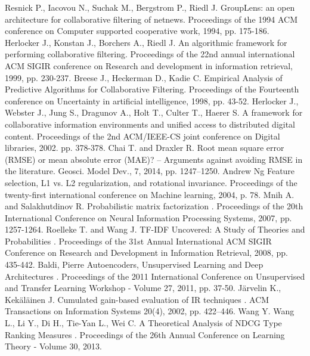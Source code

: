 \documentclass[a4paper,article,14pt]{extarticle}
\begin{document}
\begin{thebibliography}{1}
 Resnick P., Iacovou N., Suchak M., Bergstrom P., Riedl J. \flqq GroupLens: an open architecture for collaborative filtering of netnews\frqq. Proceedings of the 1994 ACM conference on Computer supported cooperative work, 1994, pp. 175-186.
 Herlocker J., Konstan J., Borchers A., Riedl J. \flqq An algorithmic framework for performing collaborative filtering\frqq. Proceedings of the 22nd annual international ACM SIGIR conference on Research and development in information retrieval, 1999, pp. 230-237.
 Breese J., Heckerman D., Kadie C. \flqq Empirical Analysis of Predictive Algorithms for Collaborative Filtering\frqq.  Proceedings of the Fourteenth conference on Uncertainty in artificial intelligence, 1998, pp. 43-52.
 Herlocker J., Webster J., Jung S., Dragunov A., Holt T., Culter T., Haerer S. \flqq A framework for collaborative information environments and unified access to distributed digital content\frqq. Proceedings of the 2nd ACM/IEEE-CS joint conference on Digital libraries, 2002. pp. 378-378.
 Chai T. and Draxler R. \flqq Root mean square error (RMSE) or mean absolute error (MAE)? – Arguments against avoiding RMSE in the literature\frqq. Geosci. Model Dev., 7, 2014, pp. 1247–1250.
 Andrew Ng \flqq Feature selection, L1 vs. L2 regularization, and rotational invariance\frqq. Proceedings of the twenty-first international conference on Machine learning, 2004, p. 78.
 Mnih A. and Salakhutdinov R. \flqq Probabilistic matrix factorization \frqq. Proceedings of the 20th International Conference on Neural Information Processing Systems, 2007, pp. 1257-1264.
 Roelleke T. and Wang J. \flqq TF-IDF Uncovered: A Study of Theories and Probabilities \frqq. Proceedings of the 31st Annual International ACM SIGIR Conference on Research and Development in Information Retrieval, 2008, pp. 435-442.
 Baldi, Pierre \flqq Autoencoders, Unsupervised Learning and Deep Architectures \frqq. Proceedings of the 2011 International Conference on Unsupervised and Transfer Learning Workshop - Volume 27, 2011, pp. 37-50.
 Järvelin K., Kekäläinen J. \flqq Cumulated gain-based evaluation of IR techniques \frqq. ACM Transactions on Information Systems 20(4), 2002, pp. 422–446.
 Wang Y. Wang L., Li Y., Di H., Tie-Yan L., Wei C. \flqq A Theoretical Analysis of NDCG Type Ranking Measures \frqq. Proceedings of the 26th Annual Conference on Learning Theory - Volume 30, 2013.
\end{thebibliography}
\end{document}
